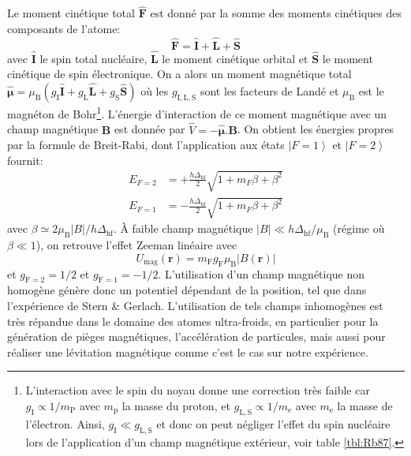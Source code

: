 Le moment cinétique total $\hat{\mathbf{F}}$ est donné par la somme des moments cinétiques des composants de l'atome:
\begin{equation}
\hat{\mathbf{F}}=\hat{\mathbf{I}}+\hat{\mathbf{L}}+\hat{\mathbf{S}}
\end{equation}
avec $\hat{\mathbf{I}}$ le spin total nucléaire, $\hat{\mathbf{L}}$ le moment cinétique orbital et $\hat{\mathbf{S}}$ le moment cinétique de spin électronique. On a alors un moment magnétique total $\hat{\boldsymbol\mu}=\mu_{\mathrm{B}} (g_{\mathrm{I}} \hat{\mathbf{I}} + g_{\mathrm{L}} \hat{\mathbf{L}} + g_{\mathrm{S}} \hat{\mathbf{S}})$ où les $g_{\mathrm{I},\mathrm{L},\mathrm{S}}$ sont les facteurs de Landé et $\mu_{\mathrm{B}}$ est le magnéton de Bohr\footnote{L'interaction avec le spin du noyau donne une correction très faible car $g_{\mathrm{I}}\propto 1/m_{\mathrm{P}}$ avec $m_{\mathrm{p}}$ la masse du proton, et $g_{\mathrm{L,S}} \propto 1/m_{\mathrm{e}}$ avec $m_{\mathrm{e}}$ la masse de l'électron. Ainsi, $g_{\mathrm{I}} \ll g_{\mathrm{L,S}}$ et donc on peut négliger l'effet du spin nucléaire lors de l'application d'un champ magnétique extérieur, voir table \ref{tbl:Rb87}.}. L'énergie d'interaction de ce moment magnétique avec un champ magnétique $\mathbf{B}$ est donnée par $\hat{V}=-\hat{\boldsymbol\mu}.\mathbf{B}$. On obtient les énergies propres par la formule de Breit-Rabi, dont l'application aux états $\left| F=1 \right\rangle$ et $\left| F=2 \right\rangle$ fournit:
\begin{equation}
\begin{aligned}
E_{F=2} &= + \frac{h \Delta_{\mathrm{hf}}}{2} \sqrt{1+ m_F \beta +\beta^2} \\
E_{F=1} &= - \frac{h \Delta_{\mathrm{hf}}}{2} \sqrt{1+ m_F \beta +\beta^2}
\end{aligned}
\label{eq:Breit-Rabi}
\end{equation}
avec $\beta \simeq 2 \mu_{\mathrm{B}} \left| B \right| /h \Delta_{\mathrm{hf}}$. À faible champ magnétique $\left| B \right| \ll h \Delta_{\mathrm{hf}} / \mu_{\mathrm{B}}$ (régime où $\beta \ll 1$), on retrouve l'effet Zeeman linéaire avec
\begin{equation}
U_{\mathrm{mag}} (\mathbf{r}) = m_{\mathrm{F}} g_{\mathrm{F}} \mu_{\mathrm{B}} \left| B(\mathbf{r}) \right|
\end{equation}
et $g_{\mathrm{F}=2}= 1/2$ et $g_{\mathrm{F}=1} =-1/2$. L'utilisation d'un champ magnétique non homogène génère donc un potentiel dépendant de la position, tel que dans l'expérience de Stern \& Gerlach. L'utilisation de tels champs inhomogènes est très répandue dans le domaine des atomes ultra-froids, en particulier pour la génération de pièges magnétiques, l'accélération de particules, mais aussi pour réaliser une lévitation magnétique comme c'est le cas sur notre expérience. 







